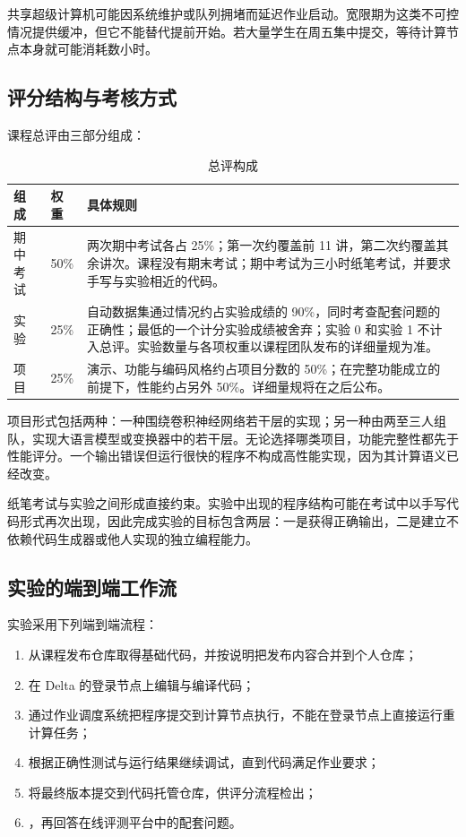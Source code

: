 \begin{warningbox}
共享超级计算机可能因系统维护或队列拥堵而延迟作业启动。宽限期为这类不可控情况提供缓冲，但它不能替代提前开始。若大量学生在周五集中提交，等待计算节点本身就可能消耗数小时。
\end{warningbox}

\subsection{评分结构与考核方式}

课程总评由三部分组成：
\begin{table}[H]
\centering
\caption{总评构成}
\begin{tabularx}{\textwidth}{L{0.22\textwidth}C{0.16\textwidth}Y}
\toprule
\textbf{组成} & \textbf{权重} & \textbf{具体规则} \\
\midrule
期中考试 & 50\% & 两次期中考试各占 25\%；第一次约覆盖前 11 讲，第二次约覆盖其余讲次。课程没有期末考试；期中考试为三小时纸笔考试，并要求手写与实验相近的代码。 \\
实验 & 25\% & 自动数据集通过情况约占实验成绩的 90\%，同时考查配套问题的正确性；最低的一个计分实验成绩被舍弃；实验 0 和实验 1 不计入总评。实验数量与各项权重以课程团队发布的详细量规为准。 \\
项目 & 25\% & 演示、功能与编码风格约占项目分数的 50\%；在完整功能成立的前提下，性能约占另外 50\%。详细量规将在之后公布。 \\
\bottomrule
\end{tabularx}
\end{table}

项目形式包括两种：一种围绕卷积神经网络若干层的实现；另一种由两至三人组队，实现大语言模型或变换器中的若干层。无论选择哪类项目，功能完整性都先于性能评分。一个输出错误但运行很快的程序不构成高性能实现，因为其计算语义已经改变。

纸笔考试与实验之间形成直接约束。实验中出现的程序结构可能在考试中以手写代码形式再次出现，因此完成实验的目标包含两层：一是获得正确输出，二是建立不依赖代码生成器或他人实现的独立编程能力。

\subsection{实验的端到端工作流}

实验采用下列端到端流程：
\begin{enumerate}
  \item 从课程发布仓库取得基础代码，并按说明把发布内容合并到个人仓库；
  \item 在 Delta 的登录节点上编辑与编译代码；
  \item 通过作业调度系统把程序提交到计算节点执行，不能在登录节点上直接运行重计算任务；
  \item 根据正确性测试与运行结果继续调试，直到代码满足作业要求；
  \item 将最终版本提交到代码托管仓库，供评分流程检出；
  \item {}，再回答在线评测平台中的配套问题。
\end{enumerate}

